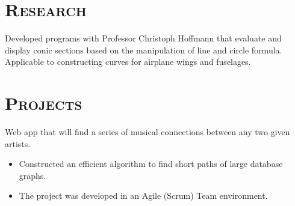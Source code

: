 \begin{resume}
  \section{\textsc{Research}}

  \begin{position}
    Developed programs with Professor Christoph Hoffmann that evaluate and display conic sections based on the manipulation of line and circle formula. Applicable to constructing curves for airplane wings and fuselages.
  \end{position}

  \section{\textsc{Projects}}

  \begin{position}
    Web app that will find a series of musical connections between any two given artists. 
    \begin{itemize}
      \setlength\itemsep{0em}
      \item Constructed an efficient algorithm to find short paths of large database graphs.
      \item The project was developed in an Agile (Scrum) Team environment.
    \end{itemize}
  \end{position}


\end{resume}
